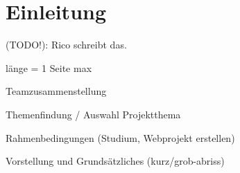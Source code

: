 

\section{Einleitung}

(TODO!): Rico schreibt das.

länge = 1 Seite max

Teamzusammenstellung 

Themenfindung / Auswahl Projektthema

Rahmenbedingungen (Studium, Webprojekt erstellen)

Vorstellung und Grundsätzliches (kurz/grob-abriss)

